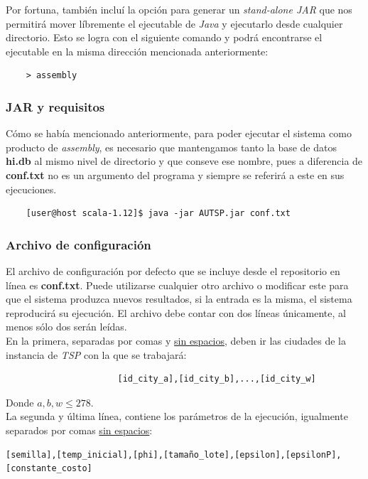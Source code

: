 \documentclass[12pt]{article}
\begin{document}
Por fortuna, también incluí la opción para generar un \textit{stand-alone JAR} que nos permitirá mover líbremente el ejecutable de \textit{Java} y ejecutarlo desde cualquier directorio. Esto se logra con el
siguiente comando y podrá encontrarse el ejecutable en la misma dirección mencionada anteriormente:
\begin{verbatim}
    > assembly
\end{verbatim}

\subsubsection*{JAR y requisitos}
Cómo se había mencionado anteriormente, para poder ejecutar el sistema como producto de \textit{assembly}, es necesario que mantengamos tanto
la base de datos \textbf{hi.db} al mismo nivel de directorio y que conseve ese nombre, pues a diferencia de \textbf{conf.txt} no es un argumento
del programa y siempre se referirá a este en sus ejecuciones.
\begin{verbatim}
    [user@host scala-1.12]$ java -jar AUTSP.jar conf.txt
\end{verbatim}

\subsubsection*{Archivo de configuración}
El archivo de configuración por defecto que se incluye desde el repositorio en línea es \textbf{conf.txt}. Puede utilizarse cualquier otro archivo o modificar este para que el sistema produzca nuevos resultados, si
la entrada es la misma, el sistema reproducirá su ejecución. El archivo
debe contar con dos líneas únicamente, al menos sólo dos serán leídas.
\\


En la primera, separadas por comas y \underline{sin espacios}, deben ir las ciudades de la instancia de \textit{TSP}
con la que se trabajará:
\begin{verbatim}
                      [id_city_a],[id_city_b],...,[id_city_w]
\end{verbatim}
Donde $a,b,w \leq 278$.\\

La segunda y última línea, contiene los parámetros de la ejecución,
igualmente separados por comas \underline{sin espacios}:

\begin{verbatim}
[semilla],[temp_inicial],[phi],[tamaño_lote],[epsilon],[epsilonP],[constante_costo]
\end{verbatim}
\end{document}
